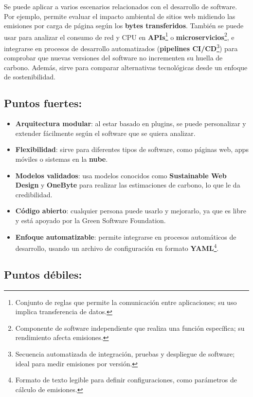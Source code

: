 \documentclass[12pt,a4paper]{report}
\begin{document}
Se puede aplicar a varios escenarios relacionados con el desarrollo de
software. Por ejemplo, permite evaluar el impacto ambiental de sitios web
midiendo las emisiones por carga de página según los \textbf{bytes
  transferidos}. También se puede usar
para analizar el consumo de red y CPU en \textbf{APIs}\footnote{Conjunto de
  reglas que permite la comunicación entre aplicaciones; su uso implica
  transferencia de datos.} o \textbf{microservicios}\footnote{Componente de
  software independiente que realiza una función específica; su rendimiento
  afecta emisiones.}, e integrarse en procesos de desarrollo automatizados
(\textbf{pipelines CI/CD}\footnote{Secuencia automatizada de integración,
  pruebas y despliegue de software; ideal para medir emisiones por versión.})
para comprobar que nuevas versiones del software no incrementen su huella de
carbono. Además, sirve para comparar alternativas tecnológicas desde un enfoque
de sostenibilidad.

\subsection*{Puntos fuertes:}

\begin{itemize}
  \item \textbf{Arquitectura modular}: al estar basado en plugins, se puede personalizar y extender fácilmente según el software que se quiera analizar.
  \item \textbf{Flexibilidad}: sirve para diferentes tipos de software, como páginas web, apps móviles o sistemas en la \textbf{nube}.
  \item \textbf{Modelos validados}: usa modelos conocidos como \textbf{Sustainable Web Design} y \textbf{OneByte} para realizar las estimaciones de carbono, lo que le da credibilidad.
  \item \textbf{Código abierto}: cualquier persona puede usarlo y mejorarlo, ya que es libre y está apoyado por la Green Software Foundation.
  \item \textbf{Enfoque automatizable}: permite integrarse en procesos automáticos de desarrollo, usando un archivo de configuración en formato \textbf{YAML}\footnote{Formato de texto legible para definir configuraciones, como parámetros de cálculo de emisiones.}.
\end{itemize}

\subsection*{Puntos débiles:}
\end{document}
